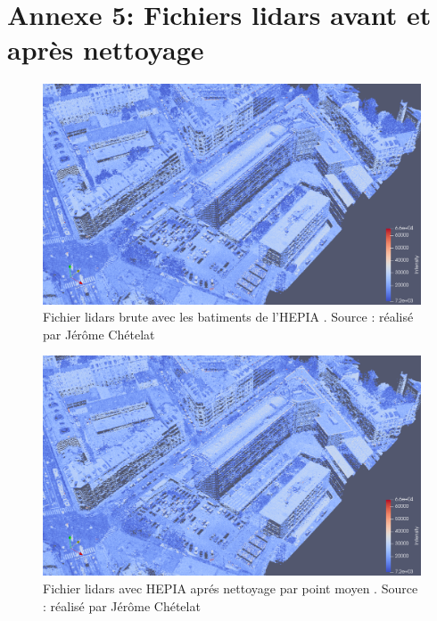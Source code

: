 \chapter*{Annexe 5: Fichiers lidars avant et après nettoyage}

\begin{figure}[htbp!]
    \centering
	\includegraphics[width=0.9\linewidth]{figures/hepia_las_before_filter.png}
	\caption{Fichier lidars brute avec les batiments de l'HEPIA . Source : réalisé par Jérôme Chételat}
	\label{fig:lidar_bef_filt}
\end{figure}

\begin{figure}[htbp!]
    \centering
	\includegraphics[width=0.9\linewidth]{figures/hepia_las_after_filter_avg.png}
	\caption{Fichier lidars avec HEPIA aprés nettoyage par point moyen . Source : réalisé par Jérôme Chételat}
	\label{fig:lidar_aft_filt_avg}
\end{figure}

